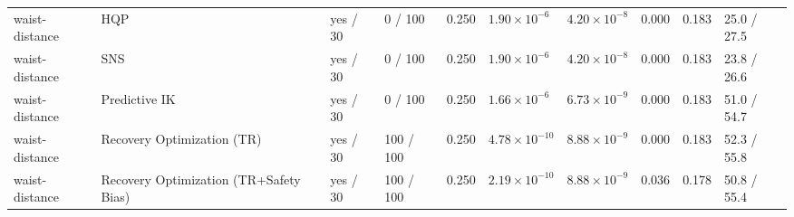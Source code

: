 \begin{tabular}{llllllllll}
waist-distance & HQP & yes / 30 & 0 / 100 & 0.250 & $1.90\times 10^{-6}$ & $4.20\times 10^{-8}$ & 0.000 & 0.183 & 25.0 / 27.5 \\
waist-distance & SNS & yes / 30 & 0 / 100 & 0.250 & $1.90\times 10^{-6}$ & $4.20\times 10^{-8}$ & 0.000 & 0.183 & 23.8 / 26.6 \\
waist-distance & Predictive IK & yes / 30 & 0 / 100 & 0.250 & $1.66\times 10^{-6}$ & $6.73\times 10^{-9}$ & 0.000 & 0.183 & 51.0 / 54.7 \\
waist-distance & Recovery Optimization (TR) & yes / 30 & 100 / 100 & 0.250 & $4.78\times 10^{-10}$ & $8.88\times 10^{-9}$ & 0.000 & 0.183 & 52.3 / 55.8 \\
waist-distance & Recovery Optimization (TR+Safety Bias) & yes / 30 & 100 / 100 & 0.250 & $2.19\times 10^{-10}$ & $8.88\times 10^{-9}$ & 0.036 & 0.178 & 50.8 / 55.4 \\
\bottomrule
\end{tabular}
